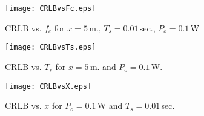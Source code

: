 \documentclass[10pt,twocolumn]{IEEEtran}
\begin{document}
\begin{figure}%
        \centering
        \texttt{[image: CRLBvsFc.eps]}
        \caption{CRLB vs. $f_c$ for $x=5$\,m., $T_s=0.01\,$sec., $P_o=0.1$\,W}
        \label{fig:CRLBvsFc}
\end{figure}

\begin{figure}%
        \centering
        \texttt{[image: CRLBvsTs.eps]}
        \caption{CRLB vs. $T_s$ for $x = 5$\,m. and $P_o=0.1$\,W.}
        \label{fig:CRLBvsTs}
\end{figure}

\begin{figure}%
        \centering
        \texttt{[image: CRLBvsX.eps]}
        \caption{CRLB vs. $x$ for $P_o=0.1$\,W and $T_s = 0.01\,$sec.}
        \label{fig:CRLBvsX}
\end{figure}

\end{document}

